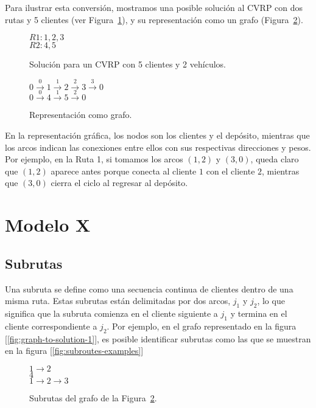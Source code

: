 \documentclass{article}
\begin{document}
Para ilustrar esta conversión, mostramos una posible solución al CVRP con dos rutas y 5 clientes (ver Figura~\ref{fig:solucion-cvrp}), y su representación como un grafo (Figura~\ref{fig:grafo-cvrp}).

\begin{figure}[h!]
$R1: 1,2,3$\\
$R2: 4,5$
    \caption{Solución para un CVRP con 5 clientes y 2 vehículos.}
    \label{fig:solucion-cvrp}
\end{figure}

\begin{figure}[h!]
$0 \overset{0}{\rightarrow}1 \overset{1}{\rightarrow}2 \overset{2}{\rightarrow}3 \overset{3}{\rightarrow}0$\\
$0 \overset{0}{\rightarrow}4 \overset{1}{\rightarrow}5 \overset{2}{\rightarrow}0$

    \caption{Representación como grafo.}
    \label{fig:grafo-cvrp}
\end{figure}

En la representación gráfica, los nodos son los clientes y el depósito, mientras que los arcos indican las conexiones entre ellos con sus respectivas direcciones y pesos. Por ejemplo, en la Ruta 1, si tomamos los arcos $(1, 2)$ y $(3, 0)$, queda claro que $(1, 2)$ aparece antes porque conecta al cliente $1$ con el cliente $2$, mientras que $(3, 0)$ cierra el ciclo al regresar al depósito.

\section {Modelo X}
\subsection {Subrutas}
Una subruta se define como una secuencia continua de clientes dentro de una misma ruta. Estas subrutas están delimitadas por dos arcos, $j_1$ y $j_2$, lo que significa que la subruta comienza en el cliente siguiente a $j_1$ y termina en el cliente correspondiente a $j_2$. Por ejemplo, en el grafo representado en la figura [\ref{fig:graph-to-solution-1}], es posible identificar subrutas como las que se muestran en la figura [\ref{fig:subroutes-examples}]

\begin{figure}[h!]
$1 \rightarrow2$\\
$4$\\
$1 \rightarrow2 \rightarrow3 $
    \caption{Subrutas del grafo de la Figura~\ref{fig:grafo-cvrp}.}
    \label{fig:subrutas-cvrp}
\end{figure}
\end{document}
